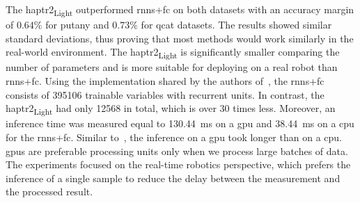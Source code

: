 \documentclass[a4paper, 10pt, twoside]{report}
\begin{document}
\begin{table}[htbp!]
    \centering
    \caption{ Classification accuracy of the proposed \acrshort{haptr}2\textsubscript{Light} and state-of-the-art \acrshort{rnn}s+\acrshort{fc}  measured on the \acrshort{qcat} and \acrshort{putany} datasets with the 10-fold cross-validation providing mean, standard deviation (SD), and min and max values for each fold. The best results are bolded.}
    \label{tab:cross-val}
    
\end{table}

The \acrshort{haptr}2\textsubscript{Light} outperformed \acrshort{rnn}s+\acrshort{fc} on both datasets with an accuracy margin of $0.64\%$ for \acrshort{putany} and $0.73\%$ for \acrshort{qcat} datasets. The results showed similar standard deviations, thus proving that most methods would work similarly in the real-world environment.  The \acrshort{haptr}2\textsubscript{Light} is significantly smaller comparing the number of parameters and is more suitable for deploying on a real robot than \acrshort{rnn}s+\acrshort{fc}. Using the implementation shared by the authors of~\cite{Ahmadi2021}, the \acrshort{rnn}s+\acrshort{fc} consists of 395106 trainable variables with recurrent units. In contrast, the \acrshort{haptr}2\textsubscript{Light} had only 12568 in total, which is over 30 times less. Moreover, an inference time was measured equal to 130.44~ms on a \acrshort{gpu} and 38.44~ms on a \acrshort{cpu} for the \acrshort{rnn}s+\acrshort{fc}. Similar to~\cite{KubaRNN}, the inference on a \acrshort{gpu} took longer than on a \acrshort{cpu}. \acrshort{gpu}s are preferable processing units only when we process large batches of data.  The experiments focused on the real-time robotics perspective, which prefers the inference of a single sample to reduce the delay between the measurement and the processed result.
\end{document}
